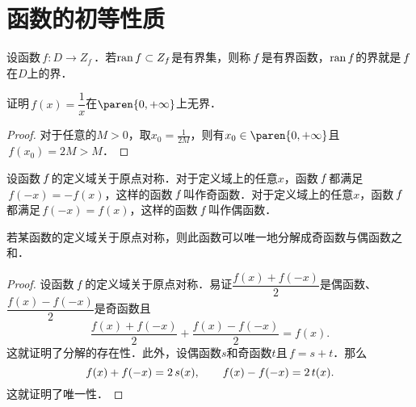 \section{函数的初等性质\label{sec:funcprops}}

\begin{definition*}
  设函数\(\,f\colon D \to Z_f\)\,．若\(\operatorname{ran} f \subset Z_f\)是有界集，则称\(\,f\mkern2mu\)是有界函数，\(\operatorname{ran} f\)的界就是\(\,f\mkern2mu\)在\(D\)上的界．
\end{definition*}

\begin{example*}
  证明\(\,f(x) = \dfrac1x\)在\(\paren{0,+\infty}\)上无界．

  \begin{proof}
    对于任意的\(M > 0\)，取\(x_0 = \frac1{2M}\)，则有\(x_0 \in \paren{0,+\infty}\)且\(\,f(x_0) = 2M > M\)．
  \end{proof}
\end{example*}

\begin{definition*}
  设函数\(\,f\mkern2mu\)的定义域关于原点对称．对于定义域上的任意\(x\)，函数\(\,f\mkern2mu\)都满足\(\,f(-x) = -f(x)\)，这样的函数\(\,f\mkern2mu\)叫作奇函数．对于定义域上的任意\(x\)，函数\(\,f\mkern2mu\)都满足\(\,f(-x) = f(x)\)，这样的函数\(\,f\mkern2mu\)叫作偶函数．
\end{definition*}

\hypertarget{T:evenodd}{}
\begin{theorem*}
  若某函数的定义域关于原点对称，则此函数可以唯一地分解成奇函数与偶函数之和．

  \begin{proof}
    设函数\(\,f\mkern2mu\)的定义域关于原点对称．易证\(\dfrac{f(x)+f(-x)}{2}\)是偶函数、\(\dfrac{f(x)-f(-x)}{2}\)是奇函数且
    \[
      \frac{f(x)+f(-x)}{2} + \frac{f(x)-f(-x)}{2} = f(x).
    \]
    这就证明了分解的存在性．此外，设偶函数\(s\)和奇函数\(t\)且\(\,f = s + t\)．那么
    \[
      f(x) + f(-x) = 2\mathop{\relax\kern0pt s}\nolimits(x),
      \qquad
      f(x) - f(-x) = 2\mathop{\relax\kern0pt t}\nolimits(x).
    \]
    这就证明了唯一性．
  \end{proof}
\end{theorem*}

